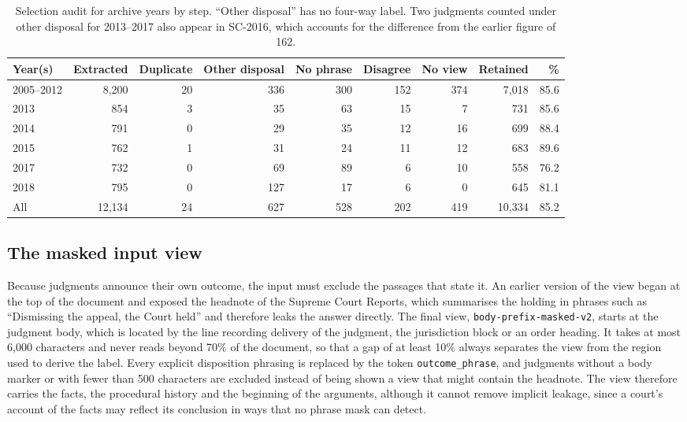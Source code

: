 \documentclass[journal]{IEEEtran}
\begin{document}
\begin{table}[!t]\centering\footnotesize
\caption{Selection audit for archive years by step. ``Other disposal'' has no four-way label. Two judgments counted under other disposal for 2013--2017 also appear in SC-2016, which accounts for the difference from the earlier figure of 162.}\label{tab:audit}
\setlength{\tabcolsep}{5pt}
\begin{tabular}{@{}lrrrrrrrr@{}}\toprule
Year(s) & Extracted & Duplicate & Other disposal & No phrase & Disagree & No view & Retained & \%\\\midrule
2005--2012 & 8,200 & 20 & 336 & 300 & 152 & 374 & 7,018 & 85.6\\
2013 & 854 & 3 & 35 & 63 & 15 & 7 & 731 & 85.6\\
2014 & 791 & 0 & 29 & 35 & 12 & 16 & 699 & 88.4\\
2015 & 762 & 1 & 31 & 24 & 11 & 12 & 683 & 89.6\\
2017 & 732 & 0 & 69 & 89 & 6 & 10 & 558 & 76.2\\
2018 & 795 & 0 & 127 & 17 & 6 & 0 & 645 & 81.1\\\midrule
All & 12,134 & 24 & 627 & 528 & 202 & 419 & 10,334 & 85.2\\\bottomrule
\end{tabular}\end{table}

\subsection{The masked input view}
Because judgments announce their own outcome, the input must exclude the passages that state it. An earlier version of the view began at the top of the document and exposed the headnote of the Supreme Court Reports, which summarises the holding in phrases such as ``Dismissing the appeal, the Court held'' and therefore leaks the answer directly. The final view, \texttt{body-prefix-masked-v2}, starts at the judgment body, which is located by the line recording delivery of the judgment, the jurisdiction block or an order heading. It takes at most 6,000 characters and never reads beyond 70\% of the document, so that a gap of at least 10\% always separates the view from the region used to derive the label. Every explicit disposition phrasing is replaced by the token \texttt{outcome\_phrase}, and judgments without a body marker or with fewer than 500 characters are excluded instead of being shown a view that might contain the headnote. The view therefore carries the facts, the procedural history and the beginning of the arguments, although it cannot remove implicit leakage, since a court's account of the facts may reflect its conclusion in ways that no phrase mask can detect.
\end{document}
